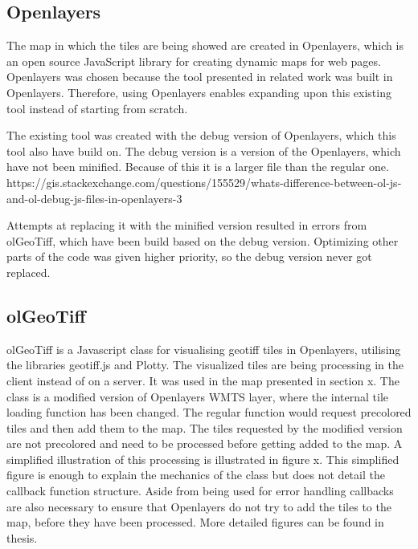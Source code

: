 \subsection*{Openlayers}
The map in which the tiles are being showed are created in Openlayers, which is an open source JavaScript library for creating dynamic maps for web pages. 
\citep{OL}
Openlayers was chosen because the tool presented in related work was built in Openlayers. Therefore, using Openlayers enables expanding upon this existing tool instead of starting from scratch. 

The existing tool was created with the debug version of Openlayers, which this tool also have build on. The debug version is a version of the Openlayers, which have not been minified. Because of this it is a larger file than the regular one. 
https://gis.stackexchange.com/questions/155529/whats-difference-between-ol-js-and-ol-debug-js-files-in-openlayers-3

Attempts at replacing it with the minified version resulted in errors from olGeoTiff, which have been build based on the debug version. Optimizing other parts of the code was given higher priority, so the debug version never got replaced. 

\subsection*{olGeoTiff}
olGeoTiff is a Javascript class for visualising geotiff tiles in Openlayers, utilising the libraries geotiff.js and Plotty. The visualized tiles are being processing in the client instead of on a server. It was used in the map presented in section x. 
The class is a modified version of Openlayers WMTS layer, where the internal tile loading function has been changed. The regular function would request precolored tiles and then add them to the map. The tiles requested by the modified version are not precolored and need to be processed before getting added to the map. A simplified illustration of this processing is illustrated in figure x. This simplified figure is enough to explain the mechanics of the class but does not detail the callback function structure. Aside from being used for error handling callbacks are also necessary to ensure that Openlayers do not try to add the tiles to the map, before they have been processed. More detailed figures can be found in \citep{Baumrocks} thesis.

